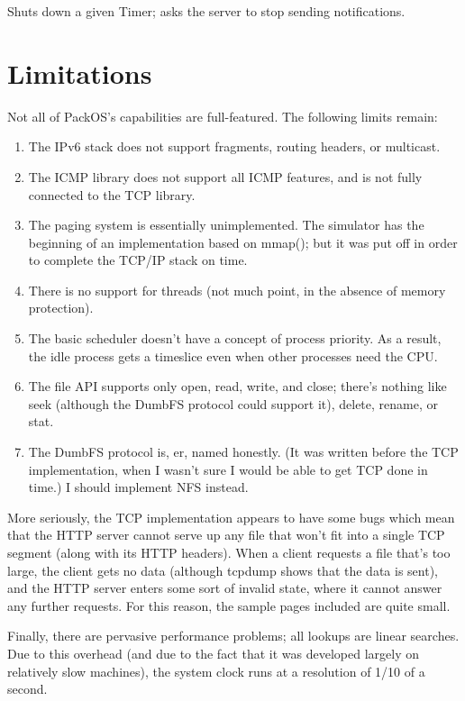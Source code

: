 \documentclass{article}
\begin{document}
Shuts down a given Timer; asks the server to stop sending
notifications.

\section{Limitations}

Not all of PackOS's capabilities are full-featured.  The following
limits remain:

\begin{enumerate}
\item{The IPv6 stack does not support fragments,
routing headers, or multicast.}
\item{The ICMP library
does not support all ICMP features, and is not fully connected to the
TCP library.}
\item{The paging system is essentially unimplemented.  The simulator
  has the beginning of an implementation based on mmap(); but it was
  put off in order to complete the TCP/IP stack on time.}
\item{There is no support for threads (not
much point, in the absence of memory protection).}
\item{The basic scheduler doesn't have a concept of process priority.
  As a result, the idle process gets a timeslice even when other
  processes need the CPU.}
\item{The file API
supports only open, read, write, and close; there's nothing like seek
(although the DumbFS protocol could support it), delete, rename, or
stat.}
\item{The DumbFS protocol is, er, named honestly.
(It was written before the TCP implementation,
when I wasn't sure I would be able to get TCP done in time.)  I
should implement NFS instead.}
\end{enumerate}

More seriously, the TCP implementation appears to have some bugs which
mean that the HTTP server cannot serve up any file that won't fit into
a single TCP segment (along with its HTTP headers).  When a client
requests a file that's too large, the client gets no data (although
tcpdump shows that the data is sent), and the HTTP server enters some
sort of invalid state, where it cannot answer any further requests.
For this reason, the sample pages included are quite small.

Finally, there are pervasive performance problems; all lookups are
linear searches.  Due to this overhead (and due to the fact that it
was developed largely on relatively slow machines), the system clock
runs at a resolution of 1/10 of a second.
\end{document}
